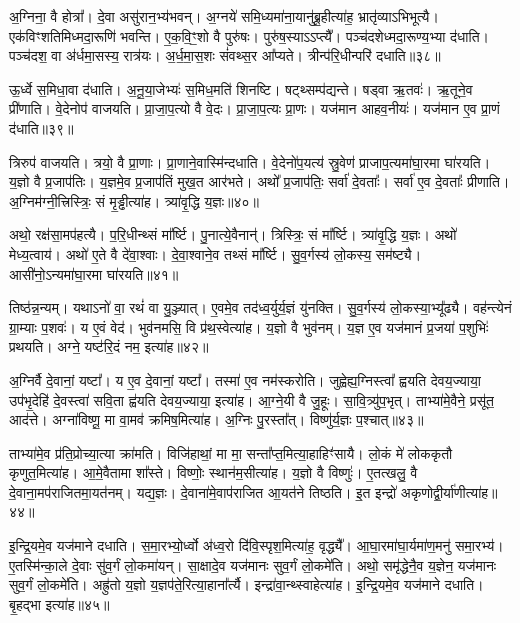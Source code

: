अ॒ग्निना॒ वै होत्रा᳚।
दे॒वा असु॑रान॒भ्य॑भवन्।
अ॒ग्नये॑ समि॒ध्यमा॑ना॒यानु॑ब्रू॒हीत्या॑ह॒ भ्रातृ॑व्याऽभिभूत्यै।
एक॑विꣳशति\-मिध्मदा॒रूणि॑ भवन्ति।
ए॒क॒वि॒ꣳ॒शो वै पुरु॑षः।
पुरु॑ष॒स्याऽऽप्त्यै᳚।
पञ्च॑दशेध्म\-दा॒रूण्य॒भ्या द॑धाति।
पञ्च॑दश॒ वा अ॑र्धमा॒सस्य॒ रात्र॑यः।
अ॒र्ध॒मा॒स॒शः सं॑वथ्स॒र आ᳚प्यते।
त्रीन्प॑रि॒धीन्परि॑ दधाति॥३८॥

ऊ॒र्ध्वे स॒मिधा॒वा द॑धाति।
अ॒नू॒या॒जेभ्यः॑ स॒मिध॒मति॑ शिनष्टि।
षट्थ्सम्प॑द्यन्ते।
षड्वा ऋ॒तवः॑।
ऋ॒तूने॒व प्री॑णाति।
वे॒देनोप॑ वाजयति।
प्रा॒जा॒प॒त्यो वै वे॒दः।
प्रा॒जा॒प॒त्यः प्रा॒णः।
यज॑मान आहव॒नीयः॑।
यज॑मान ए॒व प्रा॒णं द॑धाति॥३९॥

त्रिरुप॑ वाजयति।
त्रयो॒ वै प्रा॒णाः।
प्रा॒णाने॒वास्मि॑न्दधाति।
वे॒देनो॑प॒यत्य॑ स्रु॒वेण॑ प्राजाप॒त्यमा॑घा॒रमा घा॑रयति।
य॒ज्ञो वै प्र॒जा\-प॑तिः।
य॒ज्ञमे॒व प्र॒जा\-प॑तिं मुख॒त आर॑भते।
अथो᳚ प्र॒जा\-प॑तिः॒ सर्वा॑ दे॒वताः᳚।
सर्वा॑ ए॒व दे॒वताः᳚ प्रीणाति।
अ॒ग्निम॑ग्नी॒त्त्रिस्त्रिः॒ सं मृ॒ड्ढीत्या॑ह।
त्र्या॑वृ॒द्धि य॒ज्ञः॥४०॥

अथो॒ रक्ष॑सा॒मप॑हत्यै।
प॒रि॒धीन्थ्सं मा᳚र्ष्टि।
पु॒नात्ये॒वैनान्॑।
त्रिस्त्रिः॒ सं मा᳚र्ष्टि।
त्र्या॑वृ॒द्धि य॒ज्ञः।
अथो॑ मेध्य॒त्वाय॑।
अथो॑ ए॒ते वै दे॑वा॒श्वाः।
दे॒वा॒श्वाने॒व तथ्सं मा᳚र्ष्टि।
सु॒व॒र्गस्य॑ लो॒कस्य॒ सम॑ष्ट्यै।
आसी॑नो॒\-ऽन्यमा॑घा॒रमा घा॑रयति॥४१॥

तिष्ठ॑न्न॒न्यम्।
यथाऽनो॑ वा॒ रथं॑ वा यु॒ञ्ज्यात्।
ए॒वमे॒व तद॑ध्व॒र्युर्य॒ज्ञं यु॑नक्ति।
सु॒व॒र्गस्य॑ लो॒कस्या॒भ्यू᳚ढ्यै।
वह॑न्त्येनं ग्रा॒म्याः प॒शवः॑।
य ए॒वं वेद॑।
भुव॑नमसि॒ वि प्र॑थ॒स्वेत्या॑ह।
य॒ज्ञो वै भुव॑नम्।
य॒ज्ञ ए॒व यज॑मानं प्र॒जया॑ प॒शुभिः॑ प्रथयति।
अग्ने॒ यष्ट॑रि॒दं नम॒ इत्या॑ह॥४२॥

अ॒ग्निर्वै दे॒वानां॒ यष्टा᳚।
य ए॒व दे॒वानां॒ यष्टा᳚।
तस्मा॑ ए॒व नम॑स्करोति।
जुह्वेह्य॒ग्निस्त्वा᳚ ह्वयति देवय॒ज्याया॒ उप॑भृ॒देहि॑ दे॒वस्त्वा॑ सवि॒ता ह्व॑यति देवय॒ज्याया॒ इत्या॑ह।
आ॒ग्ने॒यी वै जु॒हूः।
सा॒वि॒त्र्यु॑प॒भृत्।
ताभ्या॑मे॒वैने॒ प्रसू॑त॒ आद॑त्ते।
अग्ना॑विष्णू॒ मा वा॒मव॑ क्रमिष॒मित्या॑ह।
अ॒ग्निः पु॒रस्ता᳚त्।
विष्णु॑र्य॒ज्ञः प॒श्चात्॥४३॥

ताभ्या॑मे॒व प्र॑ति॒प्रोच्या॒त्या क्रा॑मति।
विजि॑हाथां॒ मा मा॒ सन्ता᳚प्त॒मित्या॒हाहिꣳ॑सायै।
लो॒कं मे॑ लोककृतौ कृणुत॒मित्या॑ह।
आ॒\-मे॒वैतामा शा᳚स्ते।
विष्णोः॒ स्थान॑म॒सीत्या॑ह।
य॒ज्ञो वै विष्णुः॑।
ए॒तत्खलु॒ वै दे॒वाना॒\-मप॑\-रा\-जित\-मा॒यत॑नम्।
यद्य॒ज्ञः।
दे॒वाना॑\-मे॒वा\-प॑रा\-जित आ॒यत॑ने तिष्ठति।
इ॒त इन्द्रो॑ अकृणोद्वी॒र्या॑\-णीत्या॑ह॥४४॥

इ॒न्द्रि॒यमे॒व यज॑माने दधाति।
स॒मा॒रभ्यो॒र्ध्वो अ॑ध्व॒रो दि॑वि॒स्पृश॒मित्या॑ह॒ वृद्ध्यै᳚।
आ॒घा॒रमा॑घा॒र्यमा॑ण॒मनु॑ समा॒रभ्य॑।
ए॒तस्मि॑न्का॒ले दे॒वाः सु॑व॒र्गं लो॒कमा॑यन्।
सा॒क्षादे॒व यज॑मानः सुव॒र्गं लो॒कमे॑ति।
अथो॒ समृ॑द्धेनै॒व य॒ज्ञेन॒ यज॑मानः सुव॒र्गं लो॒कमे॑ति।
अह्रु॑तो य॒ज्ञो य॒ज्ञप॑ते॒रित्या॒हाना᳚र्त्यै।
इन्द्रा॑वा॒न्थ्स्वाहेत्या॑ह।
इ॒न्द्रि॒यमे॒व यज॑माने दधाति।
बृ॒हद्भा इत्या॑ह॥४५॥

